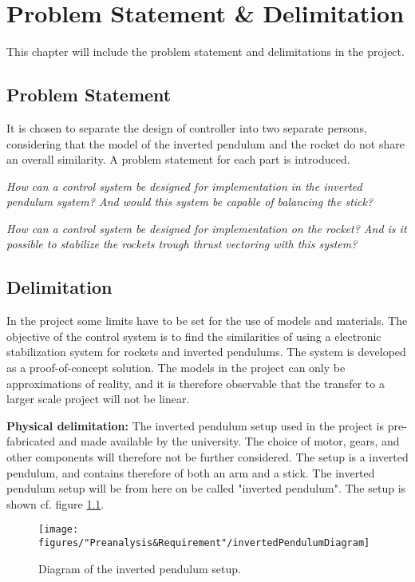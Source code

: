 \chapter{Problem Statement \& Delimitation}
This chapter will include the problem statement and delimitations in the project.

\section{Problem Statement}
It is chosen to separate the design of controller into two separate persons, considering that the model of the inverted pendulum and the rocket do not share an overall similarity. A problem statement for each part is introduced.

\bigbreak
\textit{How can a control system be designed for implementation in the inverted pendulum system? And would this system be capable of balancing the stick?}

\bigbreak
\textit{How can a control system be designed for implementation on the rocket? And is it possible to stabilize the rockets trough thrust vectoring with this system?}

\section{Delimitation}
In the project some limits have to be set for the use of models and materials. The objective of the control system is to find the similarities of using a electronic stabilization system for rockets and inverted pendulums. The system is developed as a proof-of-concept solution. The models in the project can only be approximations of reality, and it is therefore observable that the transfer to a larger scale project will not be linear.        

\textbf{Physical delimitation:}
The inverted pendulum setup used in the project is pre-fabricated and made available by the university. The choice of motor, gears, and other components will therefore not be further considered. The setup is a inverted pendulum, and contains therefore of both an arm and a stick. The inverted pendulum setup will be from here on be called "inverted pendulum". The setup is shown cf. figure \ref{fig:InvertedPendulum1}.
\begin{figure}[htbp]
	\centering
	\texttt{[image: figures/"Preanalysis\&Requirement"/invertedPendulumDiagram]}
	\caption{Diagram of the inverted pendulum setup\citep{web:BalancingStick2008}.} \label{fig:InvertedPendulum1}
\end{figure}


